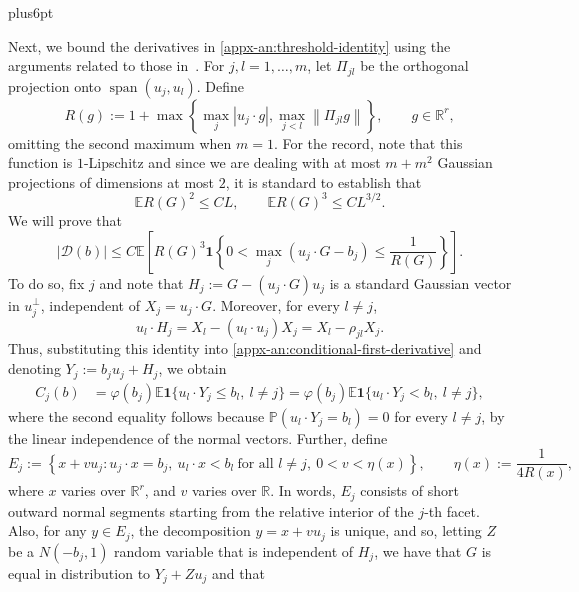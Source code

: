 \documentclass[11pt,letterpaper,twoside,leqno]{article}
\makeatletter
\theoremstyle{bookplain}
\theoremstyle{bookremark}
\renewenvironment{proof}[1][\proofname]{\par
  \pushQED{\qed}\normalfont\topsep6pt plus6pt\relax
  \trivlist\item[\hskip\labelsep\bfseries #1\@addpunct{.}]\ignorespaces
}{\popQED\endtrivlist\@endpefalse}
\newcommand{\E}{\mathbb E}
\newcommand{\Pp}{\mathbb P}
\newcommand{\R}{\mathbb R}
\newcommand{\norm}[1]{\left\lVert#1\right\rVert}
\newcommand{\ind}{\mathbf 1}
\makeatother
\begin{document}
\begin{proof}
Next, we bound the derivatives in \eqref{appx-an:threshold-identity} using the arguments related to those in~\cite{Nazarov2003,CCK17N}. For $j, l=1,\dots, m$, let \(\Pi_{j l}\) be the orthogonal projection onto \(\operatorname{span}(u_j, u_l)\). Define
\begin{equation}
 R(g):=1+\max\left\{\max_j|u_j\cdot g|,
                          \max_{j<l}\norm{\Pi_{jl}g}\right\},\qquad g\in\R^r,
 \label{appx-an:projection-radius}
\end{equation}
omitting the second maximum when \(m=1\).
For the record, note that this function is \(1\)-Lipschitz and since we are dealing with at most \(m+m^2\)
Gaussian projections of dimensions at most \(2\), it is standard to establish that
\begin{equation}
 \E R(G)^2\le CL,\qquad \E R(G)^3\le CL^{3/2}.
 \label{appx-an:projection-moments}
\end{equation}
We will prove that
\begin{equation}
 |\mathcal D(b)|
 \le C\E\left[
 R(G)^3\ind\left\{0<\max_j(u_j\cdot G-b_j)
 \le\frac1{R(G)}\right\}
 \right].
 \label{appx-an:adaptive-layer}
\end{equation}
To do so, fix \(j\) and note that
\(
H_j:=G-(u_j\cdot G)u_j
\)
is a standard Gaussian vector in \(u_j^\perp\), independent
of \(X_j=u_j\cdot G\). Moreover, for every \(l\ne j\),
\[
u_l\cdot H_j
=X_l-(u_l\cdot u_j)X_j
=X_l-\rho_{jl}X_j.
\]
Thus, substituting this identity into \eqref{appx-an:conditional-first-derivative} and denoting \(Y_j:=b_ju_j+H_j\), we obtain
\begin{equation}
\begin{aligned}
C_j(b)
&=\varphi(b_j)
\E\ind\{u_l\cdot Y_j\le b_l,\ l\ne j\}=\varphi(b_j)
\E\ind\{u_l\cdot Y_j<b_l,\ l\ne j\},
\end{aligned}
\label{appx-an:one-density}
\end{equation}
where the second equality follows because
\(\Pp(u_l\cdot Y_j=b_l)=0\) for every \(l\ne j\),
by the linear independence of the normal vectors. Further, define
\[
E_j:=\left\{
x+vu_j:
u_j\cdot x=b_j,\
u_l\cdot x<b_l\ \text{for all }l\ne j,\ 
0<v<\eta(x)
\right\},
\qquad
\eta(x):=\frac1{4R(x)},
\]
where $x$ varies over $\R^r$, and $v$ varies over $\R$.
In words, \(E_j\) consists of short outward normal segments
starting from the relative interior of the \(j\)-th facet. Also, for any $y\in E_j$, the decomposition $y = x+ vu_j$ is unique, and so, letting $Z$ be a $N(-b_j,1)$ random variable that is independent of $H_j$, we have that $G$ is equal in distribution to $Y_j + Zu_j$ and that

\end{proof}
\end{document}

